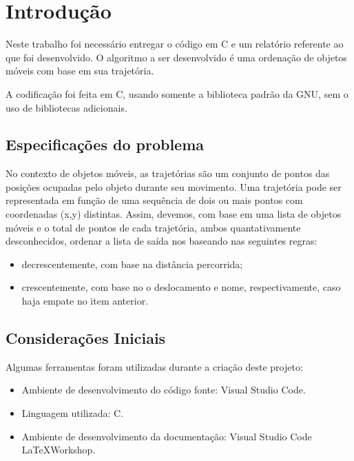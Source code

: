 \documentclass{article}
\begin{document}



\section{Introdução}

Neste trabalho foi necessário entregar o código em C e um relatório referente ao que foi desenvolvido. O algoritmo a ser desenvolvido é uma ordenação de objetos móveis com base em sua trajetória.

A codificação foi feita em C, usando somente a biblioteca padrão da GNU, sem o uso de bibliotecas adicionais.


\subsection{Especificações do problema}

No contexto de objetos móveis, as trajetórias são um conjunto de pontos das posições ocupadas pelo objeto durante seu movimento. 
Uma trajetória pode ser representada em função de uma sequência de dois ou mais pontos com coordenadas (x,y) distintas. Assim, devemos, com base em uma lista de objetos móveis e o total de pontos de cada trajetória,  ambos quantativamente desconhecidos, 
ordenar a lista de saída nos baseando nas seguintes regras:

\begin{itemize}
    \item decrescentemente, com base na distância percorrida;
    \item crescentemente, com base no o deslocamento e nome, respectivamente, caso haja empate no item anterior.
\end{itemize}

\subsection{Considerações Iniciais}
Algumas ferramentas foram utilizadas durante a criação deste projeto:

\begin{itemize}
  \item Ambiente de desenvolvimento do código fonte: Visual Studio Code.
  \item Linguagem utilizada: C.
  \item Ambiente de desenvolvimento da documentação: Visual Studio Code \LaTeX Workshop.
\end{itemize}
\end{document}
